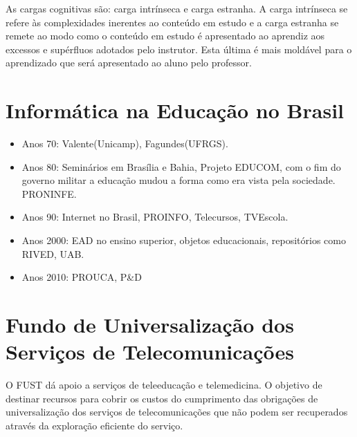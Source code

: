 \documentclass[12pt, a4paper]{article}
\begin{document}
As cargas cognitivas são: carga intrínseca e carga estranha. A carga intrínseca se refere às complexidades inerentes ao conteúdo em estudo e a carga estranha se remete ao modo como o conteúdo em estudo é apresentado ao aprendiz aos excessos e supérfluos adotados pelo instrutor. Esta última é mais moldável para o aprendizado que será apresentado ao aluno pelo professor.

\section*{Informática na Educação no Brasil}
	\begin{itemize}
		\item Anos 70: Valente(Unicamp), Fagundes(UFRGS).
		\item Anos 80: Seminários em Brasília e Bahia, Projeto EDUCOM, com o fim do governo militar a educação mudou a forma como era vista pela sociedade. PRONINFE.
		\item Anos 90: Internet no Brasil, PROINFO, Telecursos, TVEscola.
		\item Anos 2000: EAD no ensino superior, objetos educacionais, repositórios como RIVED, UAB.
		\item Anos 2010: PROUCA, P\&D
	\end{itemize}

\section*{Fundo de Universalização dos Serviços de Telecomunicações}
	O FUST dá apoio a serviços de teleeducação e telemedicina. O objetivo de destinar recursos para cobrir os custos do cumprimento das obrigações de universalização dos serviços de telecomunicações que não podem ser recuperados através da exploração eficiente do serviço.
\end{document}
